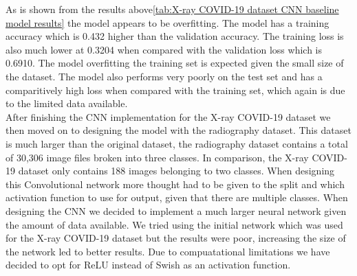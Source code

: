 As is shown from the results above\ref{tab:X-ray COVID-19 dataset CNN baseline model results} the model appears to be overfitting.  The model has a training accuracy which is 0.432 higher than the validation accuracy.  The training loss is also much lower at 0.3204 when compared with the validation loss which is 0.6910.  The model overfitting the training set is expected given the small size of the dataset.  The model also performs very poorly on the test set and has a comparitively high loss when compared with the training set, which again is due to the limited data available.
\\
After finishing the CNN implementation for the X-ray COVID-19 dataset we then moved on to designing the model with the radiography dataset. This dataset is much larger than the original dataset, the radiography dataset contains a total of 30,306 image files broken into three classes.  In comparison, the X-ray COVID-19 dataset only contains 188 images belonging to two classes.  When designing this Convolutional network more thought had to be given to the split and which activation function to use for output, given that there are multiple classes.  When designing the CNN we decided to implement a much larger neural network given the amount of data available.  We tried using the initial network which was used for the X-ray COVID-19 dataset but the results were poor, increasing the size of the network led to better results.  Due to compuatational limitations we have decided to opt for ReLU instead of Swish as an activation function.
\begin{table}[H]
    \centering
    \caption{Radiography CNN baseline model architecture}
    \label{tab:Radiography CNN baseline model architecture}
\end{table}


